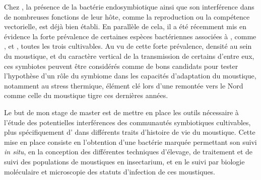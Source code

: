 Chez , la présence de la bactérie endosymbiotique  ainsi que son interférence dans de nombreuses fonctions de leur hôte, comme la reproduction ou la compétence vectorielle, est déjà bien établi.
En parallèle de cela, il a été récemment mis en évidence la forte prévalence de certaines espèces bactériennes associées à , comme ,  et , toutes les trois cultivables.
Au vu de cette forte prévalence, densité au sein du moustique, et du caractère vertical de la transmission de certains d'entre eux, ces symbiotes peuvent être considérés comme de bons candidats pour tester l'hypothèse d'un rôle du symbiome dans les capacités d'adaptation du moustique, notamment au stress thermique, élément clé lors d'une remontée vers le Nord comme celle du moustique tigre ces dernières années.

Le but de mon stage de master est de mettre en place les outils nécessaire à l'étude des potentielles interférences des communautés symbiotiques cultivables, plus spécifiquement d' dans différents traits d'histoire de vie du moustique. 
Cette mise en place consiste en l'obtention d'une bactérie marquée permettant son suivi \textit{in situ}, en la conception des différentes techniques d'élevage, de traitement et de suivi des populations de moustiques en insectarium, et en le suivi par biologie moléculaire et microscopie des statuts d'infection de ces moustiques.